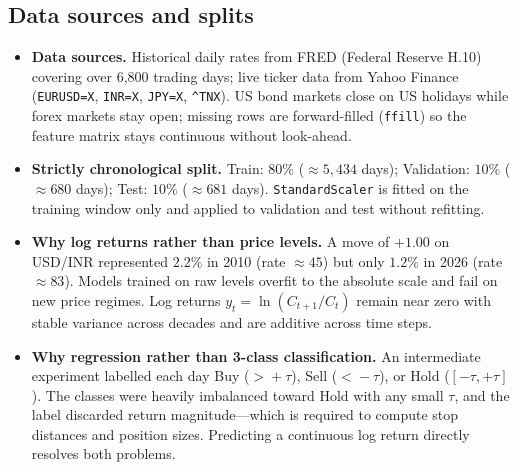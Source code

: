 \documentclass[12pt,a4paper,twoside,openany]{report}
\begin{document}
\subsection*{Data sources and splits}
\begin{itemize}
  \item \textbf{Data sources.} Historical daily rates from FRED (Federal Reserve H.10) covering over 6,800 trading days; live ticker data from Yahoo Finance (\texttt{EURUSD=X}, \texttt{INR=X}, \texttt{JPY=X}, \texttt{\textasciicircum TNX}). US bond markets close on US holidays while forex markets stay open; missing rows are forward-filled (\texttt{ffill}) so the feature matrix stays continuous without look-ahead.
  \item \textbf{Strictly chronological split.} Train: $80\%$ ($\approx5{,}434$ days); Validation: $10\%$ ($\approx680$ days); Test: $10\%$ ($\approx681$ days). \texttt{StandardScaler} is fitted on the training window only and applied to validation and test without refitting.
  \item \textbf{Why log returns rather than price levels.} A move of $+1.00$ on USD/INR represented $2.2\%$ in 2010 (rate $\approx45$) but only $1.2\%$ in 2026 (rate $\approx83$). Models trained on raw levels overfit to the absolute scale and fail on new price regimes. Log returns $y_t = \ln(C_{t+1}/C_t)$ remain near zero with stable variance across decades and are additive across time steps.
  \item \textbf{Why regression rather than 3-class classification.} An intermediate experiment labelled each day Buy ($>\!+\tau$), Sell ($<\!-\tau$), or Hold ($[-\tau,+\tau]$). The classes were heavily imbalanced toward Hold with any small $\tau$, and the label discarded return magnitude---which is required to compute stop distances and position sizes. Predicting a continuous log return directly resolves both problems.
\end{itemize}
\end{document}
